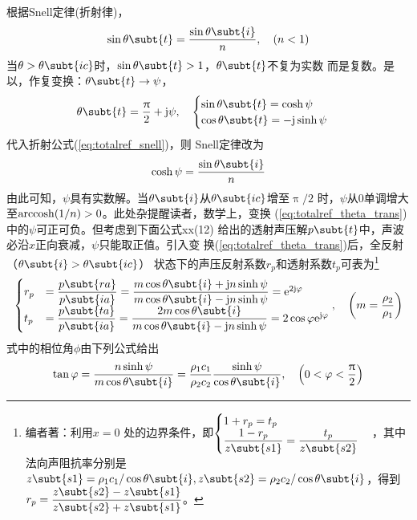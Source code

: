 \documentclass[UTF8]{ctexbook}
\begin{document}
根据Snell定律(折射律)，
\begin{equation}
	\label{eq:totalref_snell}
	\sin\theta\subt{t} = \frac{\sin\theta\subt{i}}{n}\qc (n<1)
\end{equation}
当$\theta>\theta\subt{ic}$时，$\sin\theta\subt{t}>1$，$\theta\subt{t}$不复为实数
而是复数。是以，作复变换：$\theta\subt{t} \rightarrow \psi$，
\begin{equation}
	\label{eq:totalref_theta_trans}
	\theta\subt{t} = \frac{\uppi}{2}+\mj \psi\qc 
	\begin{cases}
		\sin \theta\subt{t} = \cosh \psi\\
		\cos\theta\subt{t} = -\mj \sinh \psi
	\end{cases}
\end{equation}
代入折射公式(\ref{eq:totalref_snell})，则 Snell定律改为
\begin{equation}
	\label{eq:totalref_snell2}
	\cosh \psi = \frac{\sin \theta\subt{i}}{n}
\end{equation}
由此可知，$\psi$具有实数解。当$\theta\subt{i}$从$\theta\subt{ic}$增至$\uppi/2$
时，$\psi$从$0$单调增大至$\operatorname{arccosh}(1/n)>0$。此处杂提醒读者，数学上，变换
(\ref{eq:totalref_theta_trans})中的$\psi$可正可负。但考虑到下面公式xx(12)
给出的透射声压解$p\subt{t}$中，声波必沿$x$正向衰减，$\psi$只能取正值。引入变
换(\ref{eq:totalref_theta_trans})后，全反射（$\theta\subt{i}>\theta\subt{ic}$）
状态下的声压反射系数$r_p$和透射系数$t_p$可表为\footnote{编者著：利用$x=0$
处的边界条件，即$\begin{cases}1+r_p = t_p\\ \dfrac{1-r_p}{z\subt{s1}} =
	\dfrac{t_p}{z\subt{s2}}\end{cases}$，其中法向声阻抗率分别是
$z\subt{s1}= \rho_1c_1/\cos \theta\subt{i}, z\subt{s2} = \rho_2c_2
/\cos\theta\subt{i}$，得到$r_p = \dfrac{z\subt{s2}-z\subt{s1}}{z\subt{s2}+z\subt{s1}}
$。}
\begin{equation}
	\label{eq:totalref_rptp}
	\begin{cases}
		r_p & = \dfrac{p\subt{ra}}{p\subt{ia}} = \dfrac{m\cos \theta \subt{i} +
	\mj n \sinh \psi }{m\cos \theta\subt{i} - \mj n \sinh \psi} = 
	\me^{2\mj \phi}\\
	t_p&=\dfrac{p\subt{ta}}{p\subt{ia}} = \dfrac{2m\cos \theta \subt{i}}{m\cos 
		\theta\subt{i} - \mj n \sinh \psi} = 2\cos\phi \me^{\mj \phi}
	\end{cases}
	\qc \qty(m = \frac{\rho_2}{\rho_1})
\end{equation}
式中的相位角$\phi$由下列公式给出
\begin{equation}
	\tan \phi = \frac{n\sinh \psi}{m \cos \theta\subt{i}} = 
	\frac{\rho_1c_1}{\rho_2c_2} \frac{\sinh \psi}{\cos \theta\subt{i}}
	\qc \qty(0<\phi<\frac{\uppi}{2})
\end{equation}
\end{document}
